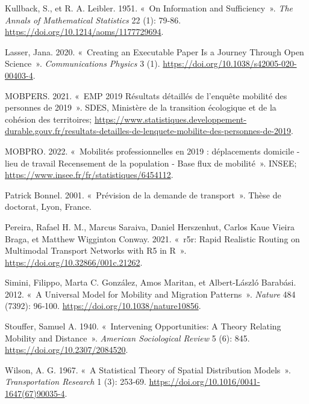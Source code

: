 \documentclass[
  10pt,
  a4paper,
  numbers=noendperiod,
  DIV=9]{scrreprt}
\newlength{\cslhangindent}
\newlength{\cslentryspacingunit} %
\newenvironment{CSLReferences}[2] %
 {%
  \setlength{\parindent}{0pt}
  \ifodd #1
  \let\oldpar\par
  \def\par{\hangindent=\cslhangindent\oldpar}
  \fi
  \setlength{\parskip}{#2\cslentryspacingunit}
 }%
 {}
\begin{document}
\begin{CSLReferences}{1}{0}
\leavevmode{}%
Kullback, S., et R. A. Leibler. 1951. {«~On Information and
Sufficiency~»}. \emph{The Annals of Mathematical Statistics} 22 (1):
79‑86. \url{https://doi.org/10.1214/aoms/1177729694}.

\leavevmode{}%
Lasser, Jana. 2020. {«~Creating an Executable Paper Is a Journey Through
Open Science~»}. \emph{Communications Physics} 3 (1).
\url{https://doi.org/10.1038/s42005-020-00403-4}.

\leavevmode{}%
MOBPERS. 2021. {«~EMP 2019 Résultats détaillés de l'enquête mobilité des
personnes de 2019~»}. SDES, Ministère de la transition écologique et de
la cohésion des territoires;
\url{https://www.statistiques.developpement-durable.gouv.fr/resultats-detailles-de-lenquete-mobilite-des-personnes-de-2019}.

\leavevmode{}%
MOBPRO. 2022. {«~Mobilités professionnelles en 2019 : déplacements
domicile - lieu de travail Recensement de la population - Base flux de
mobilité~»}. INSEE; \url{https://www.insee.fr/fr/statistiques/6454112}.

\leavevmode{}%
Patrick Bonnel. 2001. {«~Prévision de la demande de transport~»}. Thèse
de doctorat, Lyon, France.

\leavevmode{}%
Pereira, Rafael H. M., Marcus Saraiva, Daniel Herszenhut, Carlos Kaue
Vieira Braga, et Matthew Wigginton Conway. 2021. {«~r5r: Rapid Realistic
Routing on Multimodal Transport Networks with R5 in R~»}.
\url{https://doi.org/10.32866/001c.21262}.

\leavevmode{}%
Simini, Filippo, Marta C. González, Amos Maritan, et Albert-László
Barabási. 2012. {«~A Universal Model for Mobility and Migration
Patterns~»}. \emph{Nature} 484 (7392): 96‑100.
\url{https://doi.org/10.1038/nature10856}.

\leavevmode{}%
Stouffer, Samuel A. 1940. {«~Intervening Opportunities: A Theory
Relating Mobility and Distance~»}. \emph{American Sociological Review} 5
(6): 845. \url{https://doi.org/10.2307/2084520}.

\leavevmode{}%
Wilson, A. G. 1967. {«~A Statistical Theory of Spatial Distribution
Models~»}. \emph{Transportation Research} 1 (3): 253‑69.
\url{https://doi.org/10.1016/0041-1647(67)90035-4}.

\end{CSLReferences}
\end{document}
